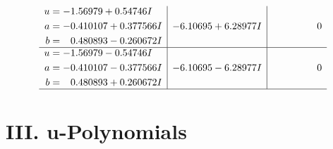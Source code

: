\documentclass[1p]{elsarticle_modified}
\theoremstyle{definition}
\begin{document}
$$\begin{array}{c|c|c}
\begin{aligned}
u &= -1.56979 + 0.54746 I \\
a &= -0.410107 + 0.377566 I \\
b &= \phantom{-}0.480893 - 0.260672 I\end{aligned}
 & -6.10695 + 6.28977 I & \phantom{-0.000000 } 0 \\ \hline\begin{aligned}
u &= -1.56979 - 0.54746 I \\
a &= -0.410107 - 0.377566 I \\
b &= \phantom{-}0.480893 + 0.260672 I\end{aligned}
 & -6.10695 - 6.28977 I & \phantom{-0.000000 } 0\\
 \hline 
 \end{array}$$\newpage
\newpage\renewcommand{\arraystretch}{1}
\centering \section*{ III. u-Polynomials}
\end{document}
